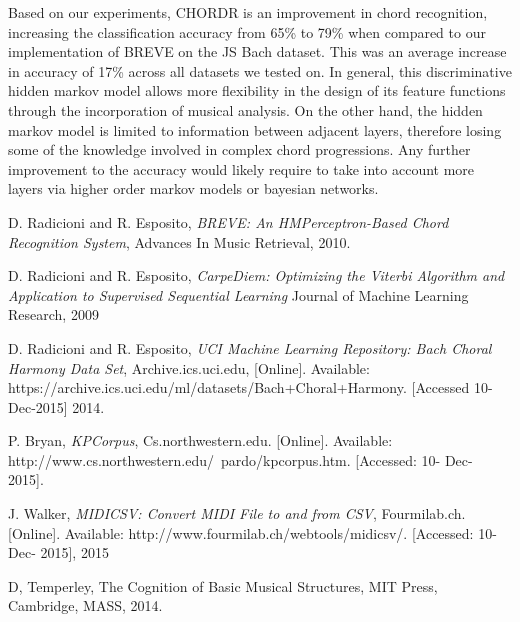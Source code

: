 \documentclass{article} %
\begin{document}
Based on our experiments, CHORDR is an improvement in chord recognition, increasing the classification accuracy from 65\% to 79\% when compared to our implementation of BREVE on the JS Bach dataset. This was an average increase in accuracy of 17\% across all datasets we tested on. In general, this discriminative hidden markov model allows more flexibility in the design of its feature functions through the incorporation of musical analysis. On the other hand, the hidden markov model is limited to information between adjacent layers, therefore losing some of the knowledge involved in complex chord progressions. Any further improvement to the accuracy would likely require to take into account more layers via higher order markov models or bayesian networks.

\begin{thebibliography}{9}

  D. Radicioni and R. Esposito,
  \emph{BREVE: An HMPerceptron-Based Chord Recognition System},
  Advances In Music Retrieval,
  2010.


  D. Radicioni and R. Esposito,
  \emph{CarpeDiem: Optimizing the Viterbi Algorithm and Application to Supervised Sequential Learning}
  Journal of Machine Learning Research,
  2009

  D. Radicioni and R. Esposito,
  \emph{UCI Machine Learning Repository: Bach Choral Harmony Data Set},
  Archive.ics.uci.edu,
  [Online]. Available: https://archive.ics.uci.edu/ml/datasets/Bach+Choral+Harmony. [Accessed 10-Dec-2015]
  2014.


  P. Bryan,
  \emph{KPCorpus},
  Cs.northwestern.edu. [Online]. Available: http://www.cs.northwestern.edu/~pardo/kpcorpus.htm. [Accessed: 10- Dec- 2015].


  J. Walker,
  \emph{MIDICSV: Convert MIDI File to and from CSV},
  Fourmilab.ch. [Online]. Available: http://www.fourmilab.ch/webtools/midicsv/. [Accessed: 10- Dec- 2015],
  2015

  D, Temperley,
  The Cognition of Basic Musical Structures,
  MIT Press, Cambridge, MASS,
  2014.

\end{thebibliography}
\end{document}
